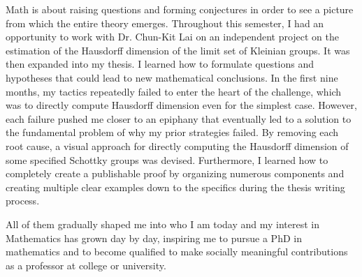 \documentclass[10pt]{amsart}
\begin{document}
Math is about raising questions and forming conjectures in order to see a picture from which the entire theory emerges. Throughout this semester, I had an opportunity to work with Dr. Chun-Kit Lai on an independent project on the estimation of the Hausdorff dimension of the limit set of Kleinian groups. It was then expanded into my thesis. I learned how to formulate questions and hypotheses that could lead to new mathematical conclusions. In the first nine months, my tactics repeatedly failed to enter the heart of the challenge, which was to directly compute Hausdorff dimension even for the simplest case. However, each failure pushed me closer to an epiphany that eventually led to a solution to the fundamental problem of why my prior strategies failed. By removing each root cause, a visual approach for directly computing the Hausdorff dimension of some specified Schottky groups was devised. Furthermore, I learned how to completely create a publishable proof by organizing numerous components and creating multiple clear examples down to the specifics during the thesis writing process.


All of them gradually shaped me into who I am today and my interest in Mathematics has grown day by day, inspiring me to pursue a PhD in mathematics and to become qualified to make socially meaningful contributions as a professor at college or university.
\end{document}
